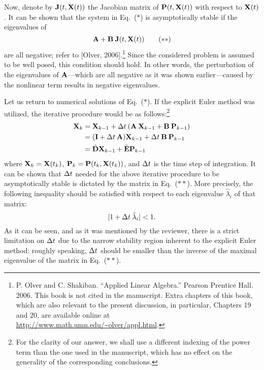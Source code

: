 \begin{authors}
Now, denote by $\m{J}(\t, \vX(\t))$ the Jacobian matrix of $\mathbf{P}(t, \mathbf{X}(t))$ with respect to $\mathbf{X}(t)$.
It can be shown that the system in Eq.~($\ast$) is asymptotically stable if the eigenvalues of
\begin{equation}
  \mA + \mB \: \m{J}(\t, \vX(\t)) \tag{$\ast\ast$}
\end{equation}
are all negative; refer to [Olver, 2006].\footnote{P. Olver and C. Shakiban. ``Applied Linear Algebra.'' Pearson Prentice Hall. 2006. This book is not cited in the manuscript. Extra chapters of this book, which are also relevant to the present discussion, in particular, Chapters 19 and 20, are available online at \url{http://www.math.umn.edu/~olver/appl.html}.}
Since the considered problem is assumed to be well posed, this condition should hold.
In other words, the perturbation of the eigenvalues of $\mA$---which are all negative as it was shown earlier---caused by the nonlinear term results in negative eigenvalues.

Let us return to numerical solutions of Eq.~($\ast$).
If the explicit Euler method was utilized, the iterative procedure would be as follows:\footnote{For the clarity of our answer, we shall use a different indexing of the power term than the one used in the manuscript, which has no effect on the generality of the corresponding conclusions.}
\begin{align*}
  \vX_k & = \vX_{k - 1} + \Delta \t \: (\mA \: \vX_{k - 1} + \mB \: \vP_{k - 1}) \\
  & = (\mI + \Delta \t \: \mA) \vX_{k - 1} + \Delta \t \: \mB \: \vP_{k - 1} \\
  & = \hat{\mCF} \vX_{k - 1} + \hat{\mCS} \vP_{k - 1}
\end{align*}
where $\mathbf{X}_k = \mathbf{X}(t_k)$, $\mathbf{P}_k = \mathbf{P}(t_k, \mathbf{X}(t_k))$, and $\Delta t$ is the time step of integration.
It can be shown that $\Delta t$ needed for the above iterative procedure to be asymptotically stable is dictated by the matrix in Eq.~($\ast\ast$).
More precisely, the following inequality should be satisfied with respect to each eigenvalue $\hat{\lambda}_i$ of that matrix:
\[
  |1 + \Delta t \: \tilde{\lambda}_i | < 1.
\]
As it can be seen, and as it was mentioned by the reviewer, there is a strict limitation on $\Delta t$ due to the narrow stability region inherent to the explicit Euler method: roughly speaking, $\Delta t$ should be smaller than the inverse of the maximal eigenvalue of the matrix in Eq.~($\ast\ast$).


\end{authors}
